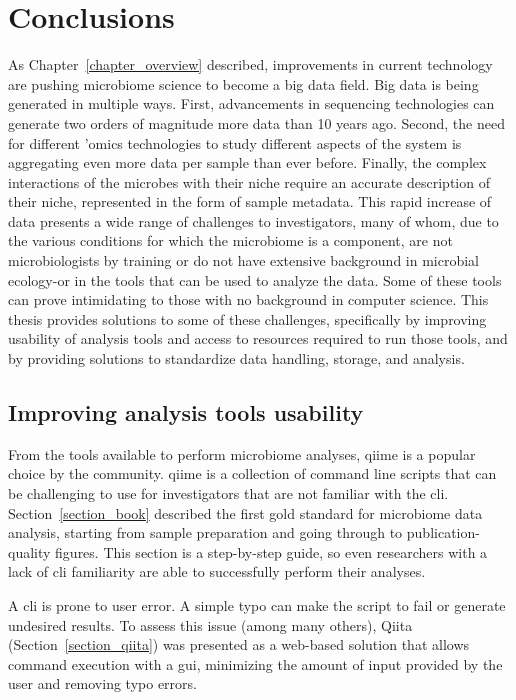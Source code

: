 \chapter{Conclusions}\label{chapter_conclusions}
\glsresetall

As Chapter~\ref{chapter_overview} described, improvements in current technology
are pushing microbiome science to become a big data field. Big data is being
generated in multiple ways. First, advancements in sequencing technologies can
generate two orders of magnitude more data than 10 years ago. Second, the need
for different 'omics technologies to study different aspects of the system is
aggregating even more data per sample than ever before. Finally, the complex
interactions of the microbes with their niche require an accurate description of
their niche, represented in the form of sample metadata. This rapid increase of
data presents a wide range of challenges to investigators, many of whom, due to
the various conditions for which the microbiome is a component, are not
microbiologists by training or do not have extensive background in microbial
ecology-or in the tools that can be used to analyze the data. Some of these tools
can prove intimidating to those with no background in computer science. This
thesis provides solutions to some of these challenges, specifically by improving
usability of analysis tools and access to resources required to run those tools,
and by providing solutions to standardize data handling, storage, and analysis.

\section{Improving analysis tools usability}

From the tools available to perform microbiome analyses, \gls{qiime} is a popular
choice by the community. \gls{qiime} is a collection of command line scripts that
can be challenging to use for investigators that are not familiar with the \gls{cli}.
Section~\ref{section_book} described the first gold standard for microbiome data
analysis, starting from sample preparation and going through to publication-quality
figures. This section is a step-by-step guide, so even researchers with a lack of \gls{cli}
familiarity are able to successfully perform their analyses.

A \gls{cli} is prone to user error. A simple typo can make the script to fail or
generate undesired results. To assess this issue (among many others), Qiita
(Section~\ref{section_qiita}) was presented as a web-based solution that allows
command execution with a \gls{gui}, minimizing the amount of input provided by
the user and removing typo errors.

